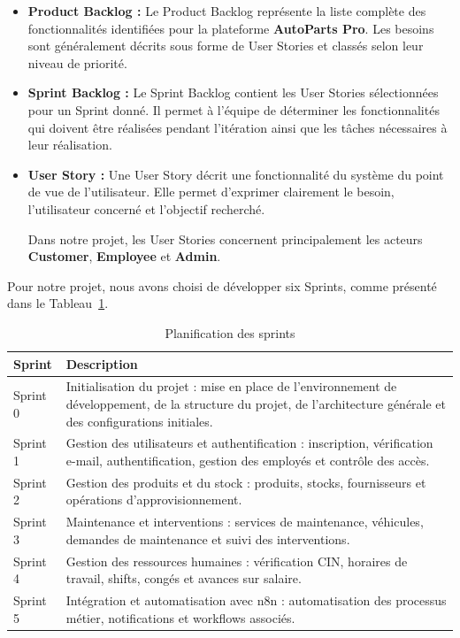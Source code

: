 \begin{itemize}

\item \textbf{Product Backlog :}
Le Product Backlog représente la liste complète des fonctionnalités identifiées pour la plateforme \textbf{AutoParts Pro}. Les besoins sont généralement décrits sous forme de User Stories et classés selon leur niveau de priorité.

\item \textbf{Sprint Backlog :}
Le Sprint Backlog contient les User Stories sélectionnées pour un Sprint donné. Il permet à l'équipe de déterminer les fonctionnalités qui doivent être réalisées pendant l'itération ainsi que les tâches nécessaires à leur réalisation.

\item \textbf{User Story :}
Une User Story décrit une fonctionnalité du système du point de vue de l'utilisateur. Elle permet d'exprimer clairement le besoin, l'utilisateur concerné et l'objectif recherché.

Dans notre projet, les User Stories concernent principalement les acteurs \textbf{Customer}, \textbf{Employee} et \textbf{Admin}.

\end{itemize}

Pour notre projet, nous avons choisi de développer six Sprints, comme présenté dans le Tableau~\ref{tab:planification-sprints-ch1}.

\begin{table}[H]
\centering
\caption{Planification des sprints}
\label{tab:planification-sprints-ch1}
\begin{tabular}{|l|p{9cm}|}
\hline
\textbf{Sprint} & \textbf{Description} \\
\hline
Sprint 0 & Initialisation du projet : mise en place de l'environnement de développement, de la structure du projet, de l'architecture générale et des configurations initiales. \\
\hline
Sprint 1 & Gestion des utilisateurs et authentification : inscription, vérification e-mail, authentification, gestion des employés et contrôle des accès. \\
\hline
Sprint 2 & Gestion des produits et du stock : produits, stocks, fournisseurs et opérations d'approvisionnement. \\
\hline
Sprint 3 & Maintenance et interventions : services de maintenance, véhicules, demandes de maintenance et suivi des interventions. \\
\hline
Sprint 4 & Gestion des ressources humaines : vérification CIN, horaires de travail, shifts, congés et avances sur salaire. \\
\hline
Sprint 5 & Intégration et automatisation avec n8n : automatisation des processus métier, notifications et workflows associés. \\
\hline
\end{tabular}
\end{table}


